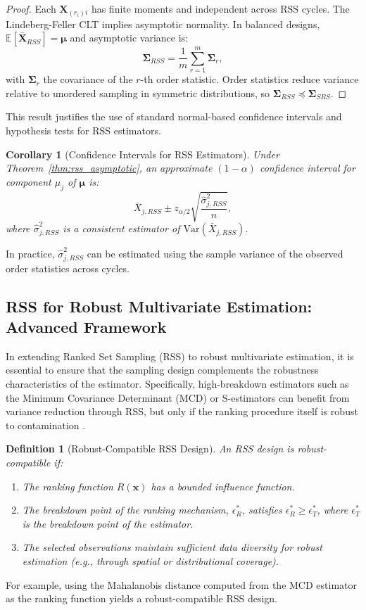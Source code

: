 \documentclass[12pt]{article}
\newtheorem{definition}{Definition}[section] %
\newtheorem{corollary}{Corollary}[section]
\begin{document}
\begin{proof}
Each $\mathbf{X}_{(r_i)i}$ has finite moments and independent across RSS cycles. The Lindeberg-Feller CLT implies asymptotic normality. In balanced designs, $\mathbb{E}[\bar{\mathbf{X}}_{RSS}]=\boldsymbol{\mu}$ and asymptotic variance is:
\[
\boldsymbol{\Sigma}_{RSS} = \frac{1}{m} \sum_{r=1}^{m} \boldsymbol{\Sigma}_r,
\]
with $\boldsymbol{\Sigma}_r$ the covariance of the $r$-th order statistic. Order statistics reduce variance relative to unordered sampling in symmetric distributions, so $\boldsymbol{\Sigma}_{RSS} \preceq \boldsymbol{\Sigma}_{SRS}$.
\end{proof}
This result justifies the use of standard normal-based confidence intervals and hypothesis tests for RSS estimators.
\begin{corollary}[Confidence Intervals for RSS Estimators]
\label{cor:rss_ci}
Under Theorem~\ref{thm:rss_asymptotic}, an approximate $(1-\alpha)$ confidence interval for component $\mu_j$ of $\boldsymbol{\mu}$ is:
\[
\bar{X}_{j,RSS} \pm z_{\alpha/2} \sqrt{\frac{\hat{\sigma}^2_{j,RSS}}{n}},
\]
where $\hat{\sigma}^2_{j,RSS}$ is a consistent estimator of $\text{Var}(\bar{X}_{j,RSS})$.
\end{corollary}
In practice, $\hat{\sigma}^2_{j,RSS}$ can be estimated using the sample variance of the observed order statistics across cycles.
\subsection{RSS for Robust Multivariate Estimation: Advanced Framework}
\label{subsec:advanced_framework}

In extending Ranked Set Sampling (RSS) to robust multivariate estimation, it is essential to ensure that the sampling design complements the robustness characteristics of the estimator. Specifically, high-breakdown estimators such as the Minimum Covariance Determinant (MCD) or S-estimators can benefit from variance reduction through RSS, but only if the ranking procedure
itself is robust to contamination \cite{taconeli2023}.

\begin{definition}[Robust-Compatible RSS Design]
\label{def:robust_rss}
An RSS design is \emph{robust-compatible} if:
\begin{enumerate}
    \item The ranking function $R(\mathbf{x})$ has a bounded influence function.
    \item The breakdown point of the ranking mechanism, $\epsilon^*_R$, satisfies $\epsilon^*_R \geq \epsilon^*_T$, where $\epsilon^*_T$ is the breakdown point of the estimator.
    \item The selected observations maintain sufficient data diversity for robust estimation (e.g., through spatial or distributional coverage).
\end{enumerate}
\end{definition}
For example, using the Mahalanobis distance computed from the MCD estimator as the ranking function yields a robust-compatible RSS design.
\end{document}
